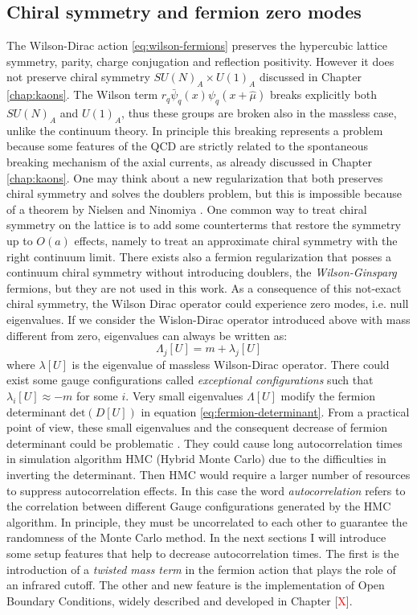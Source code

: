 \documentclass[english, LaM, oneside, noexaminfo]{sapthesis}
\newcommand{\colr}{\textcolor{red}}
\newcommand{\obc}{Open Boundary Conditions}
\begin{document}
\subsection{Chiral symmetry and fermion zero modes}\label{subsec:zero-modes}
\noindent
The Wilson-Dirac action \ref{eq:wilson-fermions} preserves the hypercubic lattice symmetry, parity, charge conjugation and reflection positivity.
However it does not preserve chiral symmetry $SU(N)_A \times U(1)_A$ discussed in Chapter \ref{chap:kaons}.
The Wilson term $r_q \bar \psi_q(x) \psi_q (x + \hat \mu)$ breaks explicitly both $SU(N)_A$ and $U(1)_A$, thus these groups are broken also in the massless case, unlike the continuum theory.
In principle this breaking represents a problem because some features of the QCD are strictly related to the spontaneous breaking mechanism of the axial currents, as already discussed in Chapter \ref{chap:kaons}.
One may think about a new regularization that both preserves chiral symmetry and solves the doublers problem, but this is impossible because of a theorem by Nielsen and Ninomiya \cite{montvay-munster}.
One common way to treat chiral symmetry on the lattice is to add some counterterms that restore the symmetry up to $O(a)$ effects, namely to treat an approximate chiral symmetry with the right continuum limit.
There exists also a fermion regularization that posses a continuum chiral symmetry without introducing doublers, the {\it Wilson-Ginsparg} fermions, but they are not used in this work.
\newline
As a consequence of this not-exact chiral symmetry, the Wilson Dirac operator could experience zero modes, i.e. null eigenvalues.
If we consider the Wislon-Dirac operator introduced above with mass different from zero, eigenvalues can always be written as:
\begin{equation}\label{eq:eigenvalues}
    \Lambda_j [U] = m + \lambda_j [U]
\end{equation}
where $\lambda [U]$ is the eigenvalue of massless Wilson-Dirac operator.
There could exist some gauge configurations called {\it exceptional configurations} such that $\lambda_i [U] \approx -m$ for some $i$. 
Very small eigenvalues $\Lambda [U]$ modify the fermion determinant $\text{det}(D[U])$ in equation \ref{eq:fermion-determinant}.
From a practical point of view, these small eigenvalues and the consequent decrease of fermion determinant could be problematic \cite{tmLQCD}.
They could cause long autocorrelation times in simulation algorithm HMC (Hybrid Monte Carlo) due to the difficulties in inverting the determinant.
Then HMC would require a larger number of resources to suppress autocorrelation effects.
In this case the word {\it autocorrelation} refers to the correlation between different Gauge configurations generated by the HMC algorithm.
In principle, they must be uncorrelated to each other to guarantee the randomness of the Monte Carlo method.
\newline
In the next sections I will introduce some setup features that help to decrease autocorrelation times.
The first is the introduction of a {\it twisted mass term} in the fermion action that plays the role of an infrared cutoff.
The other and new feature is the implementation of \obc, widely described and developed in Chapter [\colr{X}].
\end{document}
